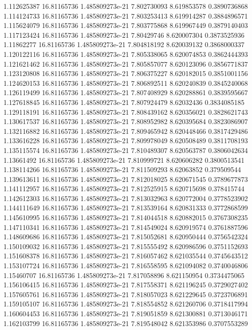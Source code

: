 {1.112625387 16.81165736 1.485809273e-21 7.802730093 8.619853578 0.3890736868
1.114124733 16.81165736 1.485809273e-21 7.803253413 8.619914287 0.3884896571
1.115624079 16.81165736 1.485809273e-21 7.803775868 8.619967449 0.3879140403
1.117123424 16.81165736 1.485809273e-21 7.80429746 8.620007304 0.3873525936
1.11862277 16.81165736 1.485809273e-21 7.804818192 8.620039132 0.3868000337
1.120122116 16.81165736 1.485809273e-21 7.805338065 8.620074853 0.3862444393
1.121621462 16.81165736 1.485809273e-21 7.805857077 8.620123096 0.3856771837
1.123120808 16.81165736 1.485809273e-21 7.806375227 8.620182015 0.3851001156
1.124620153 16.81165736 1.485809273e-21 7.806892511 8.620240839 0.3845240068
1.126119499 16.81165736 1.485809273e-21 7.807408929 8.620288861 0.3839595667
1.127618845 16.81165736 1.485809273e-21 7.807924479 8.62032436 0.3834085185
1.129118191 16.81165736 1.485809273e-21 7.808439162 8.620356021 0.3828621743
1.130617537 16.81165736 1.485809273e-21 7.808952982 8.620395684 0.3823086907
1.132116882 16.81165736 1.485809273e-21 7.809465942 8.620448466 0.3817429486
1.133616228 16.81165736 1.485809273e-21 7.809978049 8.620508489 0.3811708193
1.135115574 16.81165736 1.485809273e-21 7.810489307 8.620563787 0.3806042634
1.13661492 16.81165736 1.485809273e-21 7.810999721 8.620606282 0.3800513541
1.138114266 16.81165736 1.485809273e-21 7.811509293 8.62063852 0.379509544
1.139613611 16.81165736 1.485809273e-21 7.812018025 8.620671545 0.3789677873
1.141112957 16.81165736 1.485809273e-21 7.812525915 8.620715698 0.378415744
1.142612303 16.81165736 1.485809273e-21 7.813032963 8.620772004 0.3778523902
1.144111649 16.81165736 1.485809273e-21 7.813539164 8.620831333 0.3772868599
1.145610995 16.81165736 1.485809273e-21 7.814044518 8.620882015 0.3767308235
1.147110341 16.81165736 1.485809273e-21 7.814549024 8.620919574 0.3761887596
1.148609686 16.81165736 1.485809273e-21 7.815052681 8.620950444 0.3756542324
1.150109032 16.81165736 1.485809273e-21 7.815555492 8.620986596 0.3751152693
1.151608378 16.81165736 1.485809273e-21 7.816057462 8.621035544 0.3745643512
1.153107724 16.81165736 1.485809273e-21 7.816558595 8.621094082 0.3740046806
1.15460707 16.81165736 1.485809273e-21 7.817058896 8.621150954 0.3734475065
1.156106415 16.81165736 1.485809273e-21 7.817558371 8.621196245 0.3729027402
1.157605761 16.81165736 1.485809273e-21 7.818057023 8.621229645 0.3723706891
1.159105107 16.81165736 1.485809273e-21 7.818554852 8.621260706 0.3718417994
1.160604453 16.81165736 1.485809273e-21 7.819051859 8.621300881 0.3713046171
1.162103799 16.81165736 1.485809273e-21 7.819548042 8.621353986 0.3707553289
}
